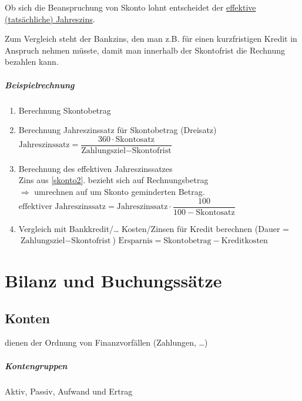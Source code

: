 Ob sich die Beanspruchung von Skonto lohnt entscheidet der \ul{effektive (tatsächliche) Jahreszins}.

Zum Vergleich steht der Bankzins, den man z.B. für einen kurzfristigen Kredit in Anspruch nehmen müsste, damit man innerhalb der Skontofrist die Rechnung bezahlen kann.



\paragraph{Beispielrechnung}
\begin{enumerate}
	\item Berechnung Skontobetrag
	\item\label{skonto2} Berechnung Jahreszinssatz für Skontobetrag (Dreisatz)\\
	$\text{Jahreszinssatz} = \dfrac{360\cdot\text{Skontosatz}}{\text{Zahlungsziel} - \text{Skontofrist}}$
	\item Berechnung des effektiven Jahreszinssatzes\\
	Zins aus \ref*{skonto2}. bezieht sich auf Rechnungsbetrag\\
	$\Rightarrow$ umrechnen auf um Skonto geminderten Betrag.\\
	$\text{effektiver Jahreszinssatz} = \text{Jahreszinssatz}\cdot\dfrac{100}{100 - \text{Skontosatz}}$
	\item Vergleich mit Bankkredit/\ldots
	\subitem Kosten/Zinsen für Kredit berechnen (Dauer = $\text{Zahlungsziel} - \text{Skontofrist}$)
	\subitem $\text{Ersparnis} = \text{Skontobetrag} - \text{Kreditkosten}$
\end{enumerate}

\clearpage
\chapter{Bilanz und Buchungssätze}
\section{Konten}
dienen der Ordnung von Finanzvorfällen (Zahlungen, \ldots)

\paragraph{Kontengruppen} Aktiv, Passiv, Aufwand und Ertrag

